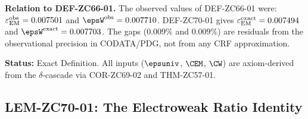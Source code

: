 \documentclass[12pt, a4paper]{article}
\renewcommand{\epsEM}{\varepsilon_{\rm EM}}
\begin{document}
\begin{formalbox}[title={DEF-ZC70-01: Exact Sector Floors
  Using $\varepsilon_{\rm univ}$ ($R_0/R_{\max}$, Exact)}]
\textbf{Relation to DEF-ZC66-01.}
The observed values of DEF-ZC66-01 were:
$\epsEM^{\rm obs} = 0.007501$ and $\epsW^{\rm obs} = 0.007710$.
DEF-ZC70-01 gives $\epsEM^{\rm exact} = 0.007494$
and $\epsW^{\rm exact} = 0.007703$.
The gaps ($0.009\%$ and $0.009\%$) are residuals from
the observational precision in CODATA/PDG, not from
any CRF approximation.

\textbf{Status:} Exact Definition.
All inputs ($\epsuniv$, $\CEM$, $\CW$) are axiom-derived
from the $\delta$-cascade via COR-ZC69-02 and THM-ZC57-01.
\end{formalbox}

\subsection{LEM-ZC70-01: The Electroweak Ratio Identity}
\label{sec:lem01}

\end{document}
